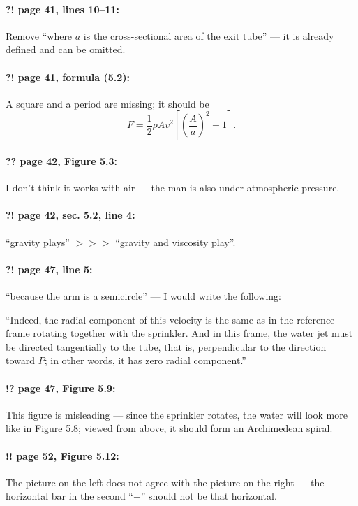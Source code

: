 \documentclass[twoside]{article}
\begin{document}
\paragraph{?! page 41, lines 10--11:} Remove “where $a$ is the cross-sectional area of the exit tube” — it is already defined and can be omitted.

\paragraph{?! page 41, formula (5.2):} A square and a period are missing; it should be
\[
F = \frac{1}{2} \rho A v^{2} \left[ \left( \frac{A}{a} \right)^{2} - 1 \right].
\]

\paragraph{?? page 42, Figure 5.3:} I don’t think it works with air — the man is also under atmospheric pressure.

\paragraph{?! page 42, sec. 5.2, line 4:} “gravity plays” $>\!>\!>$ “gravity and viscosity play”.

\paragraph{?! page 47, line 5:} “because the arm is a semicircle” — I would write the following:

“Indeed, the radial component of this velocity is the same as in the reference frame rotating together with the sprinkler.
And in this frame, the water jet must be directed tangentially to the tube, that is, perpendicular to the direction toward $P$; in other words, it has zero radial component.”

\paragraph{!? page 47, Figure 5.9:} This figure is misleading — since the sprinkler rotates, the water will look more like in Figure 5.8; viewed from above, it should form an Archimedean spiral.

\paragraph{!! page 52, Figure 5.12:} The picture on the left does not agree with the picture on the right — the horizontal bar in the second “+” should not be that horizontal.
\end{document}
